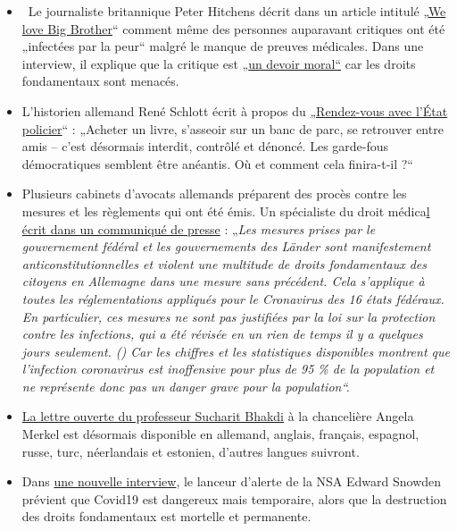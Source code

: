 \begin{itemize}
\tightlist
\item
  ~Le journaliste britannique Peter Hitchens décrit dans un article
  intitulé
  „\href{https://www.firstthings.com/web-exclusives/2020/04/we-love-big-brother}{We
  love Big Brother}`` comment même des personnes auparavant critiques
  ont été „infectées par la peur`` malgré le manque de preuves
  médicales. Dans une interview, il explique que la critique est
  „\href{https://www.spiked-online.com/podcast-episode/in-this-lockdown-dissent-is-a-moral-duty/}{un
  devoir moral``} car les droits fondamentaux sont menacés.
\item
  L'historien allemand René Schlott écrit à propos du
  \href{https://www.spiegel.de/politik/deutschland/corona-krise-und-buergerrechte-rendezvous-mit-dem-polizeistaat-a-68611322-f4d4-453f-aba5-5ec5a49ae329}{„Rendez-vous
  avec l'État policier}`` : „Acheter un livre, s'asseoir sur un banc de
  parc, se retrouver entre amis -- c'est désormais interdit, contrôlé et
  dénoncé. Les garde-fous démocratiques semblent être anéantis. Où et
  comment cela finira-t-il ?``
\item
  Plusieurs cabinets d'avocats allemands préparent des procès contre les
  mesures et les règlements qui ont été émis. Un spécialiste du droit
  médica\href{http://beatebahner.de/lib.medien/aktualisierte\%20Pressemitteilung.pdf}{l
  écrit dans un communiqué de presse} : „\emph{Les mesures prises par le
  gouvernement fédéral et les gouvernements des Länder sont
  manifestement anticonstitutionnelles et violent une multitude de
  droits fondamentaux des citoyens en Allemagne dans une mesure sans
  précédent. Cela s'applique à toutes les réglementations appliqués pour
  le Cronavirus des 16 états fédéraux. En particulier, ces mesures ne
  sont pas justifiées par la loi sur la protection contre les
  infections, qui a été révisée en un rien de temps il y a quelques
  jours seulement. () Car les chiffres et les statistiques disponibles
  montrent que l'infection coronavirus est inoffensive pour plus de 95
  \% de la population et ne représente donc pas un danger grave pour la
  population``.}
\item
  \href{https://swprs.org/open-letter-from-professor-sucharit-bhakdi-to-german-chancellor-dr-angela-merkel/}{La
  lettre ouverte du professeur Sucharit Bhakdi} à la chancelière Angela
  Merkel est désormais disponible en allemand, anglais, français,
  espagnol, russe, turc, néerlandais et estonien, d'autres langues
  suivront.
\item
  Dans \href{https://www.youtube.com/watch?v=-pcQFTzck_c}{une nouvelle
  interview}, le lanceur d'alerte de la NSA Edward Snowden prévient que
  Covid19 est dangereux mais temporaire, alors que la destruction des
  droits fondamentaux est mortelle et permanente.
\end{itemize}


